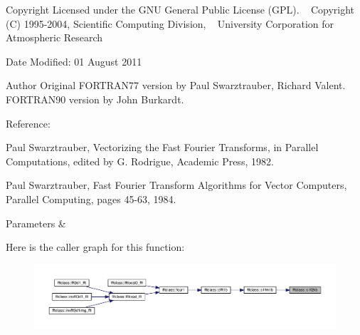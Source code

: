 \begin{DoxyCopyright}{Copyright}
Licensed under the G\+NU General Public License (G\+PL). ~\newline
 Copyright (C) 1995-\/2004, Scientific Computing Division, ~\newline
 University Corporation for Atmospheric Research 
\end{DoxyCopyright}
\begin{DoxyDate}{Date}
Modified\+: 01 August 2011 
\end{DoxyDate}
\begin{DoxyAuthor}{Author}
Original F\+O\+R\+T\+R\+A\+N77 version by Paul Swarztrauber, Richard Valent. ~\newline
 F\+O\+R\+T\+R\+A\+N90 version by John Burkardt.
\end{DoxyAuthor}
\begin{DoxyVerb} Reference:
 
    Paul Swarztrauber,
    Vectorizing the Fast Fourier Transforms,
    in Parallel Computations,
    edited by G. Rodrigue,
    Academic Press, 1982. 

    Paul Swarztrauber,
    Fast Fourier Transform Algorithms for Vector Computers,
    Parallel Computing, pages 45-63, 1984.\end{DoxyVerb}
 
\begin{DoxyParams}{Parameters}
{\em } & \\
\hline
\end{DoxyParams}
Here is the caller graph for this function\+:\nopagebreak
\begin{figure}[H]
\begin{center}
\leavevmode
\includegraphics[width=350pt]{namespacefftclass_a5b4381756639205cdda3aa66b4d3e98c_icgraph}
\end{center}
\end{figure}
\mbox{\label{namespacefftclass_a0535bb9fc14fda824be9053638cdfb2a}} 
